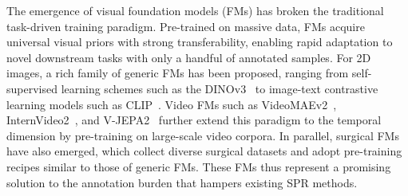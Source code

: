 The emergence of visual foundation models (FMs) has broken the traditional
task-driven training paradigm.
Pre-trained on massive data, FMs acquire universal visual priors with
strong transferability, enabling rapid adaptation to novel downstream tasks with
only a handful of annotated samples.
For 2D images, a rich family of generic FMs has been
proposed, ranging from self-supervised learning schemes such as the DINOv3~\cite{simeoni2025dinov3} to image-text contrastive learning models such as CLIP~\cite{radford2021learning}.
Video FMs such as VideoMAEv2~\cite{wang2023videomae}, InternVideo2~\cite{wang2024internvideo2}, and V-JEPA2~\cite{assran2025v}
further extend this paradigm to the temporal dimension by pre-training on
large-scale video corpora.
In parallel, surgical FMs~\cite{wang2023foundation,wang2025improving,dermyer2025endodino,yuan2024hecvl, yuan2024procedure, yuan2025learning,hu2024ophclip} have also emerged, which collect diverse
surgical datasets and adopt pre-training recipes similar to those of
generic FMs.
These FMs thus represent a promising solution to the annotation burden that hampers existing SPR methods.




